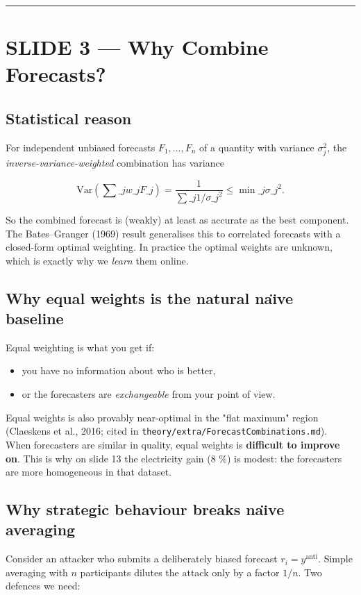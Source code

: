 \documentclass[11pt]{article}
\begin{document}
\bigskip\hrule\bigskip

\section{SLIDE 3 --- Why Combine Forecasts?}


\subsection{Statistical reason}


For independent unbiased forecasts $F_1, \dots, F_n$ of a quantity with variance $\sigma_j^2$, the \emph{inverse-variance-weighted} combination has variance

$$
\text{Var}\!\left(\sum\_j w\_j F\_j\right) = \frac{1}{\sum\_j 1/\sigma\_j^2} \le \min\_j \sigma\_j^2.
$$

So the combined forecast is (weakly) at least as accurate as the best component. The Bates--Granger (1969) result generalises this to correlated forecasts with a closed-form optimal weighting. In practice the optimal weights are unknown, which is exactly why we \emph{learn} them online.

\subsection{Why equal weights is the natural na\"{\i}ve baseline}


Equal weighting is what you get if:

\begin{itemize}
\item you have no information about who is better,
\item or the forecasters are \emph{exchangeable} from your point of view.
\end{itemize}

Equal weights is also provably near-optimal in the "flat maximum" region (Claeskens et al., 2016; cited in \texttt{theory/extra/ForecastCombinations.md}). When forecasters are similar in quality, equal weights is \textbf{difficult to improve on}. This is why on slide 13 the electricity gain (8 \%) is modest: the forecasters are more homogeneous in that dataset.

\subsection{Why strategic behaviour breaks na\"{\i}ve averaging}


Consider an attacker who submits a deliberately biased forecast $r_i = y^{\text{anti}}$. Simple averaging with $n$ participants dilutes the attack only by a factor $1/n$. Two defences we need:
\end{document}
